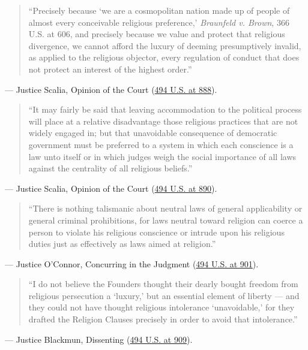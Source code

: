\documentclass[12pt]{article}
\begin{document}
\begin{quote}
``Precisely because `we are a cosmopolitan nation made up of people of almost every conceivable religious preference,' \textit{Braunfeld v. Brown}, 366 U.S. at 606, and precisely because we value and protect that religious divergence, we cannot afford the luxury of deeming presumptively invalid, as applied to the religious objector, every regulation of conduct that does not protect an interest of the highest order.''
\end{quote}
\noindent --- Justice Scalia, Opinion of the Court (\href{https://supreme.justia.com/cases/federal/us/494/872/}{494 U.S. at 888}).

\begin{quote}
``It may fairly be said that leaving accommodation to the political process will place at a relative disadvantage those religious practices that are not widely engaged in; but that unavoidable consequence of democratic government must be preferred to a system in which each conscience is a law unto itself or in which judges weigh the social importance of all laws against the centrality of all religious beliefs.''
\end{quote}
\noindent --- Justice Scalia, Opinion of the Court (\href{https://supreme.justia.com/cases/federal/us/494/872/}{494 U.S. at 890}).

\begin{quote}
``There is nothing talismanic about neutral laws of general applicability or general criminal prohibitions, for laws neutral toward religion can coerce a person to violate his religious conscience or intrude upon his religious duties just as effectively as laws aimed at religion.''
\end{quote}
\noindent --- Justice O'Connor, Concurring in the Judgment (\href{https://supreme.justia.com/cases/federal/us/494/872/}{494 U.S. at 901}).

\begin{quote}
``I do not believe the Founders thought their dearly bought freedom from religious persecution a `luxury,' but an essential element of liberty --- and they could not have thought religious intolerance `unavoidable,' for they drafted the Religion Clauses precisely in order to avoid that intolerance.''
\end{quote}
\noindent --- Justice Blackmun, Dissenting (\href{https://supreme.justia.com/cases/federal/us/494/872/}{494 U.S. at 909}).
\end{document}
